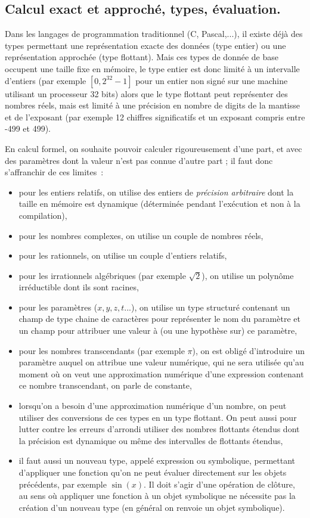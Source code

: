 \documentclass[a4paper,11pt]{article}
\begin{document}
\begin{giacjshere}
\subsection{Calcul exact et approché, types, évaluation.}
Dans les langages de programmation traditionnel (C, Pascal,...), il existe 
déjà des types permettant une représentation 
exacte des données (type entier) ou une représentation approchée 
(type flottant). Mais ces types de donnée de base 
occupent une taille fixe en mémoire, le type entier est donc
limité à un intervalle d'entiers (par exemple $[0,2^{32}-1]$ pour un entier
non signé sur une machine utilisant un processeur 32 bits) alors que le 
type flottant peut représenter des nombres réels, mais est 
limité à une précision en nombre de digits de la mantisse et de l'exposant 
(par exemple 12 chiffres significatifs et un 
exposant compris entre -499 et 499). 

En calcul formel, on souhaite pouvoir calculer rigoureusement d'une part, 
et avec des param\`etres dont la valeur n'est 
pas connue d'autre part ; il faut donc s'affranchir de ces limites~: 
\begin{itemize}
\item pour les entiers relatifs, on utilise des entiers de 
{\em précision arbitraire}
dont la taille en mémoire est dynamique (déterminée pendant l'exécution et non
à la compilation),
\item pour les nombres complexes, on utilise un couple de nombres réels,
\item pour les rationnels, on utilise un couple d'entiers relatifs,
\item pour les irrationnels algébriques (par exemple $\sqrt{2}$), 
on utilise un polyn\^ome irréductible dont ils sont racines,
\item pour les param\`etres ($x,y,z,t...$), on utilise un type 
structuré contenant un champ de type chaine de caract\`eres pour 
repr\'esenter le nom du param\`etre et
un champ pour attribuer une valeur à (ou une hypoth\`ese sur) ce param\`etre,
\item pour les nombres transcendants (par exemple $\pi$), on est obligé
d'introduire un paramètre auquel on attribue une valeur numérique, 
qui ne sera utilisée qu'au moment où on veut une 
approximation numérique d'une expression contenant ce nombre transcendant,
on parle de constante,
\item lorsqu'on a besoin d'une approximation numérique d'un nombre,
on peut utiliser des conversions de ces types en un type flottant. On peut 
aussi pour lutter contre les erreurs 
d'arrondi utiliser des nombres flottants étendus dont la précision est 
dynamique ou même des intervalles de flottants étendus,
\item il faut aussi
un nouveau type, appelé expression ou symbolique, permettant d'appliquer
une fonction qu'on ne peut évaluer directement sur les objets pr\'ec\'edents,
par exemple $\sin(x)$. Il
doit s'agir d'une op\'eration de clôture, au sens où appliquer une fonction \`a
un objet symbolique ne nécessite pas la création d'un nouveau type
(en général on renvoie un objet symbolique).
\end{itemize}


\end{giacjshere}
\end{document}
